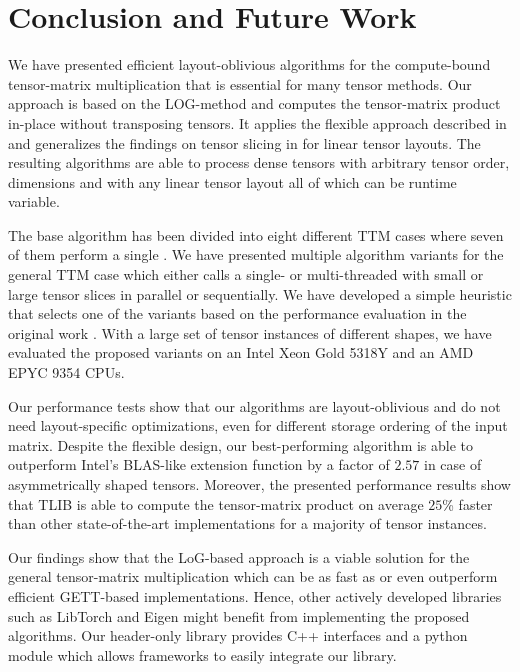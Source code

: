 \section{Conclusion and Future Work}
\label{sec:conclusion}
We have presented efficient layout-oblivious algorithms for the compute-bound tensor-matrix multiplication that is essential for many tensor methods.
Our approach is based on the LOG-method and computes the tensor-matrix product in-place without transposing tensors.
It applies the flexible approach described in \cite{bassoy:2019:ttv} and generalizes the findings on tensor slicing in \cite{li:2015:input} for linear tensor layouts.
The resulting algorithms are able to process dense tensors with arbitrary tensor order, dimensions and with any linear tensor layout all of which can be runtime variable.

The base algorithm has been divided into eight different TTM cases where seven of them perform a single .
We have presented multiple algorithm variants for the general TTM case which either calls a single- or multi-threaded  with small or large tensor slices in parallel or sequentially.
We have developed a simple heuristic that selects one of the variants based on the performance evaluation in the original work \cite{bassoy:2024:ttm}.
With a large set of tensor instances of different shapes, we have evaluated the proposed variants on an Intel Xeon Gold 5318Y and an AMD EPYC 9354 CPUs.

Our performance tests show that our algorithms are layout-oblivious and do not need layout-specific optimizations, even for different storage ordering of the input matrix.
Despite the flexible design, our best-performing algorithm is able to outperform Intel's BLAS-like extension function  by a factor of $2.57$ in case of asymmetrically shaped tensors.
Moreover, the presented performance results show that TLIB is able to compute the tensor-matrix product on average $25$\% faster than other state-of-the-art implementations for a majority of tensor instances.

Our findings show that the LoG-based approach is a viable solution for the general tensor-matrix multiplication which can be as fast as or even outperform efficient GETT-based implementations.
Hence, other actively developed libraries such as LibTorch and Eigen might benefit from implementing the proposed algorithms.
Our header-only library provides C++ interfaces and a python module which allows frameworks to easily integrate our library.

